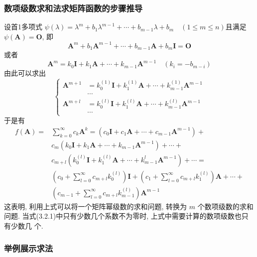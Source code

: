 \subsubsection{数项级数求和法求矩阵函数的步骤推导}

设首1多项式 $\psi(\lambda) =\lambda^m + b_1 \lambda^{m-1} + \cdots + b_{m-1}\lambda + b_m \quad (1 \leqslant m \leqslant n) $且满足 $\psi(\bm{A}) = \bm{O}$, 即
$$
    \bm{A}^m + b_1 \bm{A}^{m-1} + \cdots + b_{m-1}\bm{A} + b_m\bm{I} = \bm{O}
$$
或者
\begin{equation}
    \bm{A}^m = k_0\bm{I} + k_1\bm{A} + \cdots + k_{m-1}\bm{A}^{m-1} \quad (k_i = -b_{m-i})
    \tag{3.2.1}
\end{equation}
由此可以求出
$$
    \begin{cases}
        \bm{A}^{m+1} & = k_0^{(1)} \bm{I} + k_1^{(1)} \bm{A} + \cdots + k_{m-1}^{(1)}\bm{A}^{m-1} \\
                     & \cdots                                                                     \\
        \bm{A}^{m+l} & = k_0^{(l)} \bm{I} + k_1^{(l)} \bm{A} + \cdots + k_{m-1}^{(l)}\bm{A}^{m-1} \\
                     & \cdots
    \end{cases}
$$
于是有
\begin{align*}
    f(\bm{A}) = & \sum\limits_{k = 0}^{\infty} c_k \bm{A}^k = (c_0 \bm{I} + c_1 \bm{A} + \cdots + c_{m-1}\bm{A}^{m-1}) +             \\
                & c_m(k_0\bm{I} + k_1\bm{A} + \cdots + k_{m-1}\bm{A}^{m-1}) + \cdots +                                               \\
                & c_{m + l}(k_0^{(l)}\bm{I} + k_1^{(l)}\bm{A} + \cdots + k_{m-1}^{l}\bm{A}^{m-1}) + \cdots =                         \\
                & (c_0 + \sum_{l=0}^\infty c_{m + l}k^{(l)}_0)\bm{I} + (c_1 + \sum_{l=0}^\infty c_{m + l}k_1^{(l)})\bm{A} + \cdots + \\
                & (c_{m-1} + \sum_{l=0}^{\infty} c_{m+l}k_{m-1}^{(l)})\bm{A}^{m-1}
\end{align*}
这表明, 利用上式可以将一个矩阵幂级数的求和问题, 转换为 $m$ 个数项级数的求和问题.
当式(3.2.1)中只有少数几个系数不为零时, 上式中需要计算的数项级数也只有少数几
个.

\subsubsection{举例展示求法}


